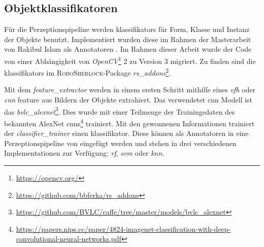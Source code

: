 \subsection{Objektklassifikatoren}
\label{sec:classifiers}
Für die Perzeptionspipeline werden \glspl{klassifikator} für Form, Klasse und Instanz der Objekte benutzt. Implementiert wurden diese im Rahmen der Masterarbeit von Rakibul Islam als \robosherlock Annotatoren \cite{rakib}. Im Rahmen dieser Arbeit wurde der Code von einer Abhängigkeit von \textit{OpenCV}\footnote{\url{https://opencv.org/}} 2 zu Version 3 migriert. Zu finden sind die \glspl{klassifikator} im \textsc{RoboSherlock}-Package \textit{rs\_addons}\footnote{\url{https://github.com/bbferka/rs\_addons}}. \par
Mit dem \textit{feature\_extractor} werden in einem ersten Schritt mithilfe eines \textit{\gls{vfh}} oder \textit{\gls{cnn}} \gls{feature} aus Bildern der Objekte extrahiert. Das verwendetet \gls{cnn} Modell ist das \textit{bvlc\_alexnet}\footnote{\url{https://github.com/BVLC/caffe/tree/master/models/bvlc\_alexnet}}. Dies wurde mit einer Teilmenge der Trainingsdaten des bekannten AlexNet \gls{cnn}s\footnote{\url{https://papers.nips.cc/paper/4824-imagenet-classification-with-deep-convolutional-neural-networks.pdf}} trainiert. Mit den gewonnenen Informationen trainiert der \textit{classifier\_trainer} einen \gls{klassifikator}. Diese können als Annotatoren in eine Perzeptionspipeline von \robosherlock eingefügt werden und stehen in drei verschiedenen Implementationen zur Verfügung: \textit{\gls{rf}}, \textit{\gls{svm}} oder \textit{\gls{knn}}.

